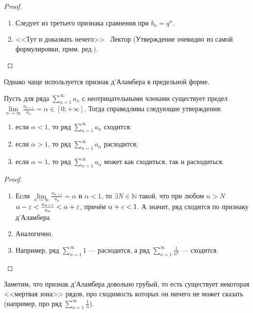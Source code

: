 \documentclass[a4paper, 12pt]{article}
\begin{document}
\begin{proof}
\ 
\begin{enumerate}
	\item 	Следует из третьего признака сравнения при $b_n = q^n$. 
	\item <<Тут и доказвать нечего>> \textcopyright\ Лектор (Утверждение очевидно из самой формулировки, прим. ред.).
\end{enumerate}
\end{proof}

Однако чаще используется признак д'Аламбера в предельной форме.

\begin{Consequence}
Пусть для ряда $\sum\limits_{n=1}^{\infty} a_n$ с неотрицательными членами существует предел $\lim\limits_{n\rightarrow\infty} \frac{a_{n+1}}{a_n} = \alpha \in [0; +\infty]$. Тогда справедливы следующие утверждения:
\begin{enumerate}
	\item если $\alpha < 1$, то ряд $\sum\limits_{n=1}^{\infty} a_n$ сходится;
	\item если $\alpha > 1$, то ряд $\sum\limits_{n=1}^{\infty} a_n$ расходится;
	\item если $\alpha = 1$, то ряд $\sum\limits_{n=1}^{\infty} a_n$ может как сходиться, так и расходиться. 
\end{enumerate}
\end{Consequence}

\begin{proof}
	\ 
	\begin{enumerate}
		\item 	Если $\lim\limits_{n\rightarrow\infty} \frac{a_{n+1}}{a_n} = \alpha$ и $\alpha < 1$, то $\exists N \in \mathbb{N}$ такой, что при любом $n > N$ $\alpha-\varepsilon<\frac{a_{n+1}}{a_n} < \alpha+\varepsilon$, причём $\alpha+\varepsilon <1$. А значит, ряд сходится по признаку д'Аламбера.
		\item Аналогично.
		\item Например, ряд $\sum\limits_{n=1}^{\infty} 1$ --- расходится, а ряд $\sum\limits_{n=1}^{\infty} \frac{1}{n^2}$ --- сходится. 

	\end{enumerate}
\end{proof}
Заметим, что признак д'Аламбера довольно грубый, то есть существует некоторая <<мертвая зона>> рядов, про сходимость которых он ничего не может сказать (например, про ряд  $\sum\limits_{n=1}^{\infty} \frac{1}{n}$).
\end{document}
